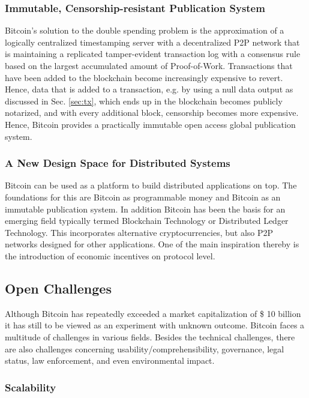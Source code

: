 \subsubsection{Immutable, Censorship-resistant Publication System}

Bitcoin's solution to the double spending problem is the approximation of a logically centralized timestamping server with a decentralized P2P network that is maintaining a replicated tamper-evident transaction log with a consensus rule based on the largest accumulated amount of Proof-of-Work. Transactions that have been added to the blockchain become increasingly expensive to revert. Hence, data that is added to a transaction, e.g. by using a null data output as discussed in Sec. \ref{sec:tx}, which ends up in the blockchain becomes publicly notarized, and with every additional block, censorship becomes more expensive. Hence, Bitcoin provides a practically immutable open access global publication system.

\subsubsection{A New Design Space for Distributed Systems}

Bitcoin can be used as a platform to build distributed applications on top. The foundations for this are Bitcoin as programmable money and Bitcoin as an immutable publication system. In addition Bitcoin has been the basis for an emerging field typically termed Blockchain Technology or Distributed Ledger Technology. This incorporates alternative cryptocurrencies, but also P2P networks designed for other applications. One of the main inspiration thereby is the introduction of economic incentives on protocol level. 

\subsection{Open Challenges}
\label{sec:btc_challenges}

Although Bitcoin has repeatedly exceeded a market capitalization of \$ 10 billion it has still to be viewed as an experiment with unknown outcome. Bitcoin faces a multitude of challenges in various fields. Besides the technical challenges, there are also challenges concerning usability/comprehensibility, governance, legal status, law enforcement, and even environmental impact. 

\subsubsection{Scalability}

